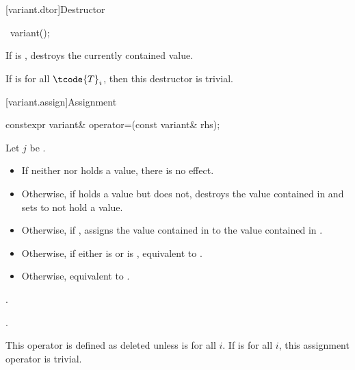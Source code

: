 [variant.dtor]{Destructor}

%
\begin{itemdecl}
~variant();
\end{itemdecl}

\begin{itemdescr}
\pnum
\effects
If  is ,
destroys the currently contained value.

\pnum
\remarks
If  is  for all $\tcode{T}_i$,
then this destructor is trivial.
\end{itemdescr}

[variant.assign]{Assignment}

%
\begin{itemdecl}
constexpr variant& operator=(const variant& rhs);
\end{itemdecl}

\begin{itemdescr}
\pnum
Let $j$ be .

\pnum
\effects
\begin{itemize}
\item
If neither  nor  holds a value, there is no effect.
\item
Otherwise, if  holds a value but  does not, destroys the value
contained in  and sets  to not hold a value.
\item
Otherwise, if , assigns the value contained in 
to the value contained in .
\item
Otherwise, if either 
is  or
 is ,
equivalent to .
\item
Otherwise, equivalent to .
\end{itemize}

\pnum
\returns
{}.

\pnum
\ensures
{}.

\pnum
\remarks
This operator is defined as deleted unless
is  for all $i$.
If 
is  for all $i$, this assignment operator is trivial.
\end{itemdescr}

